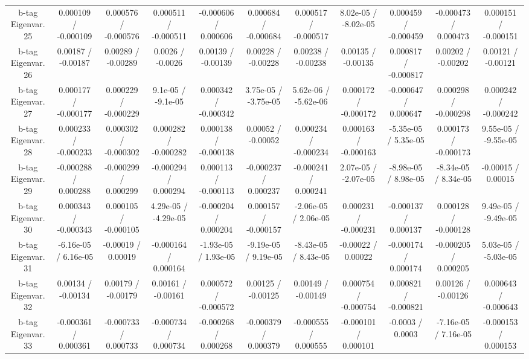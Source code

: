 \begin{table}[htbp]
\begin{center}
\begin{tabular}{|c|c|c|c|c|c|c|c|c|c|c|}
  b-tag Eigenvar. 25 & 0.000109 / -0.000109 & 0.000576 / -0.000576 & 0.000511 / -0.000511 & -0.000606 / 0.000606 & 0.000684 / -0.000684 & 0.000517 / -0.000517 & 8.02e-05 / -8.02e-05 & 0.000459 / -0.000459 & -0.000473 / 0.000473 & 0.000151 / -0.000151 \\ 
  b-tag Eigenvar. 26 & 0.00187 / -0.00187 & 0.00289 / -0.00289 & 0.0026 / -0.0026 & 0.00139 / -0.00139 & 0.00228 / -0.00228 & 0.00238 / -0.00238 & 0.00135 / -0.00135 & 0.000817 / -0.000817 & 0.00202 / -0.00202 & 0.00121 / -0.00121 \\ 
  b-tag Eigenvar. 27 & 0.000177 / -0.000177 & 0.000229 / -0.000229 & 9.1e-05 / -9.1e-05 & 0.000342 / -0.000342 & 3.75e-05 / -3.75e-05 & 5.62e-06 / -5.62e-06 & 0.000172 / -0.000172 & -0.000647 / 0.000647 & 0.000298 / -0.000298 & 0.000242 / -0.000242 \\ 
  b-tag Eigenvar. 28 & 0.000233 / -0.000233 & 0.000302 / -0.000302 & 0.000282 / -0.000282 & 0.000138 / -0.000138 & 0.00052 / -0.00052 & 0.000234 / -0.000234 & 0.000163 / -0.000163 & -5.35e-05 / 5.35e-05 & 0.000173 / -0.000173 & 9.55e-05 / -9.55e-05 \\ 
  b-tag Eigenvar. 29 & -0.000288 / 0.000288 & -0.000299 / 0.000299 & -0.000294 / 0.000294 & 0.000113 / -0.000113 & -0.000237 / 0.000237 & -0.000241 / 0.000241 & 2.07e-05 / -2.07e-05 & -8.98e-05 / 8.98e-05 & -8.34e-05 / 8.34e-05 & -0.00015 / 0.00015 \\ 
  b-tag Eigenvar. 30 & 0.000343 / -0.000343 & 0.000105 / -0.000105 & 4.29e-05 / -4.29e-05 & -0.000204 / 0.000204 & 0.000157 / -0.000157 & -2.06e-05 / 2.06e-05 & 0.000231 / -0.000231 & -0.000137 / 0.000137 & 0.000128 / -0.000128 & 9.49e-05 / -9.49e-05 \\ 
  b-tag Eigenvar. 31 & -6.16e-05 / 6.16e-05 & -0.00019 / 0.00019 & -0.000164 / 0.000164 & -1.93e-05 / 1.93e-05 & -9.19e-05 / 9.19e-05 & -8.43e-05 / 8.43e-05 & -0.00022 / 0.00022 & -0.000174 / 0.000174 & -0.000205 / 0.000205 & 5.03e-05 / -5.03e-05 \\ 
  b-tag Eigenvar. 32 & 0.00134 / -0.00134 & 0.00179 / -0.00179 & 0.00161 / -0.00161 & 0.000572 / -0.000572 & 0.00125 / -0.00125 & 0.00149 / -0.00149 & 0.000754 / -0.000754 & 0.000821 / -0.000821 & 0.00126 / -0.00126 & 0.000643 / -0.000643 \\ 
  b-tag Eigenvar. 33 & -0.000361 / 0.000361 & -0.000733 / 0.000733 & -0.000734 / 0.000734 & -0.000268 / 0.000268 & -0.000379 / 0.000379 & -0.000555 / 0.000555 & -0.000101 / 0.000101 & -0.0003 / 0.0003 & -7.16e-05 / 7.16e-05 & -0.000153 / 0.000153 \\ 

\end{tabular}
\end{center}
\end{table}
